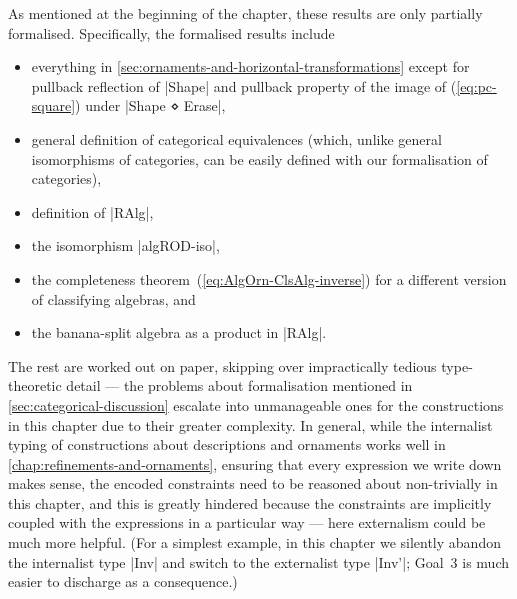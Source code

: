 As mentioned at the beginning of the chapter, these results are only partially formalised.
Specifically, the formalised results include
\begin{itemize}
\item everything in \autoref{sec:ornaments-and-horizontal-transformations} except for pullback reflection of |Shape| and pullback property of the image of (\ref{eq:pc-square}) under |Shape ⋄ Erase|,
\item general definition of categorical equivalences (which, unlike general isomorphisms of categories, can be easily defined with our formalisation of categories),
\item definition of |RAlg|,
\item the isomorphism |algROD-iso|,
\item the completeness theorem~(\ref{eq:AlgOrn-ClsAlg-inverse}) for a different version of classifying algebras, and
\item the banana-split algebra as a product in |RAlg|.
\end{itemize}
The rest are worked out on paper, skipping over impractically tedious type-theoretic detail --- the problems about formalisation mentioned in \autoref{sec:categorical-discussion} escalate into unmanageable ones for the constructions in this chapter due to their greater complexity.
In general, while the internalist typing of constructions about descriptions and ornaments works well in \autoref{chap:refinements-and-ornaments}, ensuring that every expression we write down makes sense, the encoded constraints need to be reasoned about non-trivially in this chapter, and this is greatly hindered because the constraints are implicitly coupled with the expressions in a particular way --- here externalism could be much more helpful.
(For a simplest example, in this chapter we silently abandon the internalist type |Inv| and switch to the externalist type |Inv'|; Goal~3 is much easier to discharge as a consequence.)

